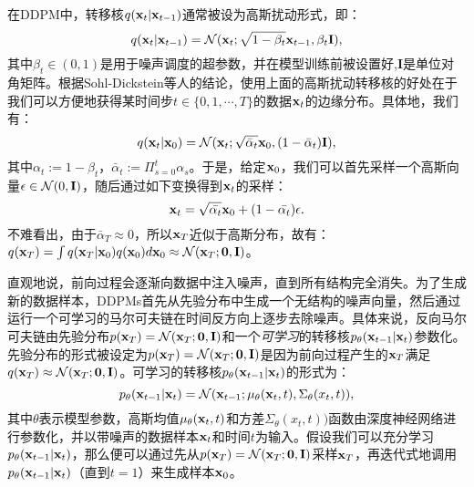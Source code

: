 \documentclass[11pt,a4paper,UTF8]{ctexart}
\begin{document}
在DDPM中，转移核$q(\mathbf{x}_t|\mathbf{x}_{t-1})$通常被设为高斯扰动形式，即：
\begin{equation}
    q(\mathbf{x}_t|\mathbf{x}_{t-1}) =\mathcal{N}(\mathbf{x}_t;\sqrt{1-\beta_t}\mathbf{x}_{t-1},\beta_t\mathbf{I}),
\label{ddpm:forward_process}
\end{equation}
其中$\beta_t\in(0,1)$是用于噪声调度的超参数，并在模型训练前被设置好,$\mathbf{I}$是单位对角矩阵。根据Sohl-Dickstein等人\cite{sohldickstein2015diffusion}的结论，使用上面的高斯扰动转移核的好处在于我们可以方便地获得某时间步$t\in\{0,1,\cdots,T\}$的数据$\mathbf{x}_t$的边缘分布。具体地，我们有：
\begin{equation}
    q(\mathbf{x}_t|\mathbf{x}_0)=\mathcal{N}(\mathbf{x}_t;\sqrt{\bar{\alpha}_t}\mathbf{x}_0,(1-\bar{\alpha}_t)\mathbf{I}),
\label{ddpm:bar_alpha}
\end{equation}
其中$\alpha_t:=1-\beta_t$，$\bar{\alpha}_t:=\Pi_{s=0}^t\alpha_s$。于是，给定$\mathbf{x}_0$，我们可以首先采样一个高斯向量$\epsilon\in\mathcal{N}(0,\mathbf{I})$，随后通过如下变换得到$\mathbf{x}_t$的采样：
\begin{equation*}
    \mathbf{x}_t=\sqrt{\bar{\alpha_t}}\mathbf{x}_0 + (1-\bar{\alpha_t})\epsilon.
\end{equation*}
不难看出，由于$\bar{\alpha}_T\approx 0$，所以$\mathbf{x}_T$近似于高斯分布，故有：$q(\mathbf{x}_T)=\int q(\mathbf{x}_T|\mathbf{x}_0)q(\mathbf{x}_0)d\mathbf{x}_0\approx \mathcal{N}(\mathbf{x}_T;\mathbf{0},\mathbf{I})$。

直观地说，前向过程会逐渐向数据中注入噪声，直到所有结构完全消失。为了生成新的数据样本，DDPMs首先从先验分布中生成一个无结构的噪声向量，然后通过运行一个可学习的马尔可夫链在时间反方向上逐步去除噪声。具体来说，反向马尔可夫链由先验分布$p(\mathbf{x}_T)=\mathcal{N}(\mathbf{x}_T;\mathbf{0},\mathbf{I})$和一个\emph{可学习}的转移核$p_{\theta}(\mathbf{x}_{t-1}|\mathbf{x}_t)$参数化。先验分布的形式被设定为$p(\mathbf{x}_T)=\mathcal{N}(\mathbf{x}_T;\mathbf{0},\mathbf{I})$是因为前向过程产生的$\mathbf{x}_T$满足$q(\mathbf{x}_T)\approx \mathcal{N}(\mathbf{x}_T;\mathbf{0},\mathbf{I})$。可学习的转移核$p_{\theta}(\mathbf{x}_{t-1}|\mathbf{x}_t)$的形式为：
\begin{equation*}
    p_{\theta}(\mathbf{x}_{t-1}|\mathbf{x}_t) = \mathcal{N}(\mathbf{x}_{t-1};\mu_{\theta}(\mathbf{x}_t,t),\Sigma_{\theta}(x_t,t)),
\end{equation*}
其中$\theta$表示模型参数，高斯均值$\mu_{\theta}(\mathbf{x}_t,t)$和方差$\Sigma_{\theta}(x_t,t))$函数由深度神经网络进行参数化，并以带噪声的数据样本$\mathbf{x}_t$和时间$t$为输入。假设我们可以充分学习$p_{\theta}(\mathbf{x}_{t-1}|\mathbf{x}_t)$，那么便可以通过先从$p(\mathbf{x}_T)=\mathcal{N}(\mathbf{x}_T;\mathbf{0},\mathbf{I})$采样$\mathbf{x}_T$，再迭代式地调用$p_{\theta}(\mathbf{x}_{t-1}|\mathbf{x}_t)$（直到$t=1$）来生成样本$\mathbf{x}_0$。
\end{document}
